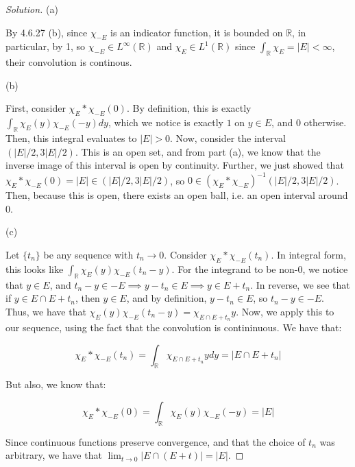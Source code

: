 \documentclass[10pt]{article}
\begin{document}
\begin{proof}[Solution]

(a)

By 4.6.27 (b), since $\chi_{-E}$ is an indicator function, it is bounded on $\mathbb{R}$, in particular, by 1, so $\chi_{-E} \in L^\infty(\mathbb{R})$ and $\chi_{E} \in L^1(\mathbb{R})$ since $\int_{\mathbb{R}} \chi_{E} = |E|< \infty$, their convolution is continous.

(b)

First, consider $\chi_E \ast \chi_{-E}(0)$. By definition, this is exactly $\int_{\mathbb{R}} \chi_E(y)\chi_{-E}(-y) dy$, which we notice is exactly $1$ on $y \in E$, and $0$ otherwise. Then, this integral evaluates to $|E| > 0$. Now, consider the interval $(|E|/2, 3|E|/2)$. This is an open set, and from part (a), we know that the inverse image of this interval is open by continuity. Further, we just showed that $\chi_E \ast \chi_{-E}(0) = |E| \in (|E|/2, 3|E|/2)$, so $0 \in (\chi_E \ast \chi_{-E})^{-1}(|E|/2, 3|E|/2)$. Then, because this is open, there exists an open ball, i.e. an open interval around 0.

(c)

Let $\{ t_n \}$ be any sequence with $t_n \to 0$. Consider $\chi_E \ast \chi_{-E}(t_n)$. In integral form, this looks like $\int_{\mathbb{R}} \chi_E(y) \chi_{-E}(t_n - y)$. For the integrand to be non-0, we notice that $y \in E$, and $t_n - y \in -E \implies y - t_n \in E \implies y \in E + t_n$. In reverse, we see that if $y \in E \cap E + t_n$, then $y \in E$, and by definition, $y- t_n \in E$, so $ t_n -y \in -E$. Thus, we have that $\chi_E(y) \chi_{-E}(t_n - y) = \chi_{E \cap E + t_n} y$. Now, we apply this to our sequence, using the fact that the convolution is contininuous. We have that:

$$ \chi_E \ast \chi_{-E}(t_n) = \int_{\mathbb{R}} \chi_{E \cap E + t_n} y dy = |E \cap E + t_n| $$

But also, we know that:

$$  \chi_E \ast \chi_{-E}(0) = \int_{\mathbb{R}} \chi_E(y) \chi_{-E}(-y) = |E|$$

Since continuous functions preserve convergence, and that the choice of $t_n$ was arbitrary, we have that $\lim_{t \to 0} | E \cap (E + t)| = |E|$.


\end{proof}
\end{document}
